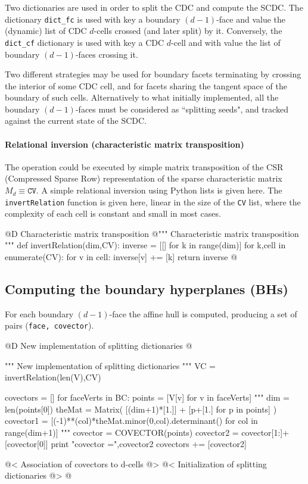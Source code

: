 \documentclass[11pt,oneside]{article}	%
\begin{document}
Two dictionaries are used in order to split the CDC and compute the SCDC. The dictionary \texttt{dict\_fc} is used with key a boundary $(d-1)$-face and value the (dynamic) list of CDC $d$-cells crossed (and later split) by it. Conversely, the  \texttt{dict\_cf} dictionary is used with key a CDC $d$-cell and with value the list of boundary $(d-1)$-faces crossing it.

Two different strategies may be used for boundary facets terminating by crossing the interior of some CDC cell, and for facets sharing the tangent space of the boundary of such cells.
Alternatively to what initially implemented, all the boundary $(d-1)$-faces must be considered as ``splitting seeds", and tracked against the current state of the SCDC.


\paragraph{Relational inversion (characteristic matrix transposition)}

The operation could be executed by simple matrix transposition of the CSR (Compressed Sparse Row) representation of the sparse characteristic matrix $M_d \equiv \texttt{CV}$.
A simple relational inversion using Python lists is given here. The \texttt{invertRelation} function 
is given here, linear in the size of the \texttt{CV} list, where the complexity of each cell is constant and 
small in most cases.

@D Characteristic matrix transposition
@{""" Characteristic matrix transposition """
def invertRelation(dim,CV):
	inverse = [[] for k in range(dim)]
	for k,cell in enumerate(CV):
		for v in cell:
			inverse[v] += [k]
	return inverse
@}


\subsection{Computing the boundary hyperplanes (BHs)}

For each boundary $(d-1)$-face the affine hull is computed, producing a set of pairs (\texttt{face, covector}).

@D New implementation of splitting dictionaries
@{""" New implementation of splitting dictionaries """
VC = invertRelation(len(V),CV)

covectors = []
for faceVerts in BC:
	points = [V[v] for v in faceVerts]
	"""
	dim = len(points[0])
	theMat = Matrix( [(dim+1)*[1.]] + [p+[1.] for p in points] )
	covector1 = [(-1)**(col)*theMat.minor(0,col).determinant() 
						for col in range(dim+1)]
	"""
	covector = COVECTOR(points)
	covector2 = covector[1:]+[covector[0]] 
	print "covector =",covector2
	covectors += [covector2]

@< Association of covectors to d-cells @>
@< Initialization of splitting dictionaries @>
@}
\end{document}
